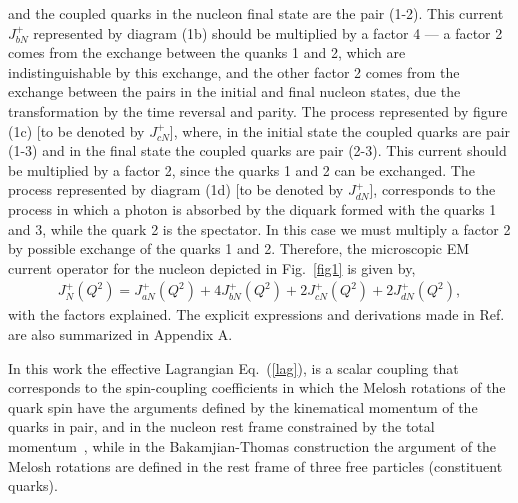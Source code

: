 \documentclass[preprint,aps,showpacs,floatfix]{revtex4}
\begin{document}
and the coupled quarks in the nucleon final state are the  pair (1-2). 
This current $J^+_{bN}$ represented by diagram (1b) should be multiplied 
by a factor 4 --- a factor 2 comes from the exchange between the quanks 1 and 2, 
which are indistinguishable by this exchange, and the other factor 2 comes from 
the exchange between the pairs in the initial and final nucleon states, 
due the transformation by the time reversal and parity. 
The process represented by figure (1c) [to be denoted by $J^+_{cN}$], where, in the initial state  
the coupled quarks are pair (1-3) and in the final state the coupled quarks are 
pair (2-3). This current should be multiplied by a factor 2, since 
the quarks 1 and 2 can be exchanged. 
The process represented by diagram (1d) [to be denoted by $J^+_{dN}$], corresponds 
to the process in which a photon is absorbed by the diquark formed with the quarks 1 and 3, 
while the quark 2 is the spectator. In this case we must multiply a factor 2 
by possible exchange of the quarks 1 and 2. Therefore, 
the microscopic EM current operator for the nucleon depicted 
in Fig.~\ref{fig1} is given by, 
\begin{eqnarray}
J^+_N(Q^2)=J^+_{aN}(Q^2)+4J^+_{bN}(Q^2)+2J^+_{cN}(Q^2)+2J^+_{dN}(Q^2), 
\label{mjp}
\end{eqnarray}
with the factors explained. The explicit expressions 
and derivations made in Ref.~\cite{afsbw} are also summarized in Appendix A.


In this work the effective Lagrangian Eq.~(\ref{lag}), is a scalar coupling that
corresponds to the spin-coupling coefficients in which the Melosh
rotations of the quark spin have the arguments defined by the
kinematical momentum of the quarks in pair, and in the nucleon rest
frame constrained by the total momentum~\cite{araujo99,Araujo2006}, while in
the Bakamjian-Thomas construction  the argument of the Melosh
rotations are defined in the rest frame  of three free 
particles (constituent quarks).
\end{document}

